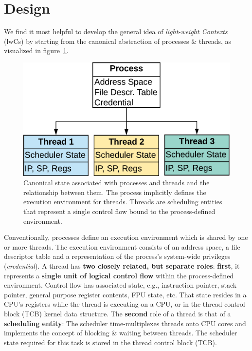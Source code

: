 \documentclass[10pt,twocolumn,letter]{article}
\begin{document}
\section{Design}\label{design}
We find it most helpful to develop the general idea of \textit{light-weight Contexts} (lwCs) by starting from the canonical abstraction of processes \& threads, as visualized in figure~\ref{design:fig:canonicalprocthreads}.
\begin{figure}
  \label{design:fig:canonicalprocthreads}
  \includegraphics[width=\linewidth]{fig/canonical-proc-thread-relationship}
  \caption{
    Canonical state associated with processes and threads and the relationship between them.
    The process implicitly defines the execution environment for threads.
    Threads are scheduling entities that represent a single control flow bound to the process-defined environment.
  }
\end{figure}
Conventionally, processes define an execution environment which is shared by one or more threads.
The execution environment consists of an address space, a file descriptor table and a representation of the process's system-wide privileges (\textit{credential}).
A thread has \textbf{two closely related, but separate roles}:
\textbf{first}, it represents a \textbf{single unit of logical control flow} within the process-defined environment.
Control flow has associated state, e.g., instruction pointer, stack pointer, general purpose register contents, FPU state, etc.
That state resides in a CPU's registers while the thread is executing on a CPU, or in the thread control block (TCB) kernel data structure.
The \textbf{second} role of a thread is that of a \textbf{scheduling entity}:
The scheduler time-multiplexes threads onto CPU cores and implements the concept of blocking \& waiting between threads.
The scheduler state required for this task is stored in the thread control block (TCB).
\end{document}
